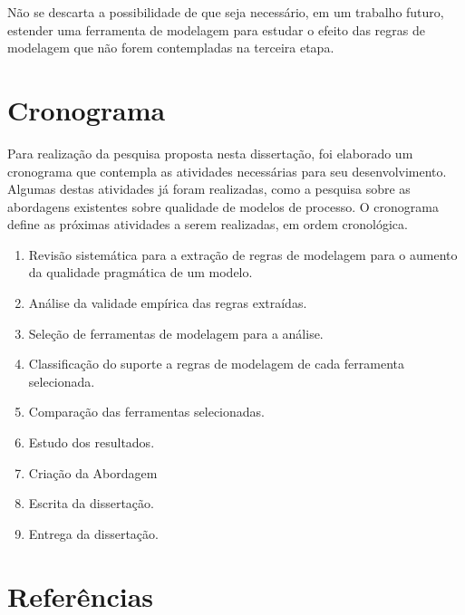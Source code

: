 \documentclass[12pt]{article}
\begin{document}
Não se descarta a possibilidade de que seja necessário, em um trabalho futuro, estender uma ferramenta de modelagem para estudar o efeito das regras de modelagem que não forem contempladas na terceira etapa.

\section{Cronograma}

Para realização da pesquisa proposta nesta dissertação, foi elaborado um cronograma que contempla as atividades necessárias para seu desenvolvimento. Algumas destas atividades já foram realizadas, como a pesquisa sobre as abordagens existentes sobre qualidade de modelos de processo. O cronograma define as próximas atividades a serem realizadas, em ordem cronológica.

\begin{enumerate}
	\item Revisão sistemática para a extração de regras de modelagem para o aumento da qualidade pragmática de um modelo.
	\item Análise da validade empírica das regras extraídas.
	\item Seleção de ferramentas de modelagem para a análise.
	\item Classificação do suporte a regras de modelagem de cada ferramenta selecionada.
	\item Comparação das ferramentas selecionadas.
	\item Estudo dos resultados.
	\item Criação da Abordagem
	\item Escrita da dissertação.
	\item Entrega da dissertação.
\end{enumerate}

\newpage
\section{Referências}


\end{document}

